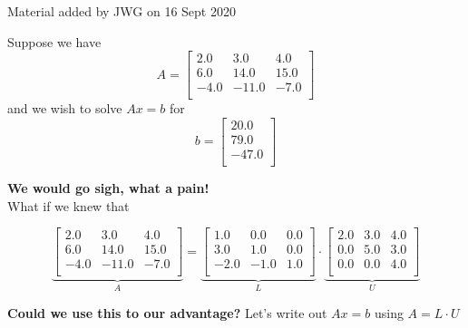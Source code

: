 \begin{center}
    Material added by JWG on 16 Sept 2020
\end{center}

Suppose we have 
\begin{equation}
A=\left[
\begin{array}{rrr}
2.0 & 3.0 & 4.0 \\
6.0 & 14.0 & 15.0 \\
-4.0 & -11.0 & -7.0 \\
\end{array}
\right]
\end{equation}
and we wish to solve $Ax=b$
for 
\begin{equation}
b=\left[
\begin{array}{r}
20.0 \\
79.0 \\
-47.0 \\
\end{array}
\right]
\end{equation}

\textbf{\LARGE We would go sigh, what a pain!} \\

What if we knew that 

\begin{equation}
\underbrace{\left[
\begin{array}{rrr}
2.0 & 3.0 & 4.0 \\
6.0 & 14.0 & 15.0 \\
-4.0 & -11.0 & -7.0 \\
\end{array}
\right]}_{A} = 
\underbrace{\left[
\begin{array}{rrr}
1.0 & 0.0 & 0.0 \\
3.0 & 1.0 & 0.0 \\
-2.0 & -1.0 & 1.0 \\
\end{array}
\right]}_{L} \cdot \underbrace{\left[
\begin{array}{ccc}
2.0 & 3.0 & 4.0 \\
0.0 & 5.0 & 3.0 \\
0.0 & 0.0 & 4.0 \\
\end{array}
\right]}_{U}
\end{equation}

\vspace*{1cm}
\textbf{\LARGE Could we use this to our advantage?}
\newpage
Let's write out $Ax = b$ using $A=L \cdot U$

